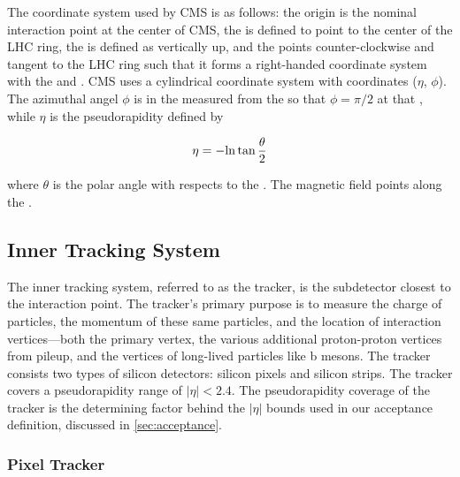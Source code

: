 The coordinate system used by CMS is as follows: the origin is the nominal
interaction point at the center of CMS, the \xaxis is defined to point to the
center of the LHC ring, the \yaxis is defined as vertically up, and the \zaxis
points counter-clockwise and tangent to the LHC ring such that it forms a
right-handed coordinate system with the \xaxis and \yaxis. CMS uses a
cylindrical coordinate system with coordinates ($\eta$, $\phi$). The azimuthal
angel $\phi$ is in the \xyplane measured from the \xaxis so that $\phi=\pi/2$
at that \xaxis, while $\eta$ is the pseudorapidity defined by

\begin{equation}
    \eta = -{\mathrm{ln}} \tan \frac{\theta}{2}
\end{equation}

where $\theta$ is the polar angle with respects to the \zaxis. The magnetic
field points along the \zaxis.

\subsection{Inner Tracking System}

The inner tracking system, referred to as the tracker, is the subdetector
closest to the interaction point. The tracker's primary purpose is to measure
the charge of particles, the momentum of these same particles, and the location
of interaction vertices---both the primary vertex, the various additional
proton-proton vertices from pileup, and the vertices of long-lived particles
like b mesons. The tracker consists two types of silicon detectors: silicon
pixels and silicon strips. The tracker covers a pseudorapidity range of $|\eta|
< 2.4$. The pseudorapidity coverage of the tracker is the determining factor
behind the $|\eta|$ bounds used in our acceptance definition, discussed in
\cref{sec:acceptance}.

\subsubsection{Pixel Tracker}

